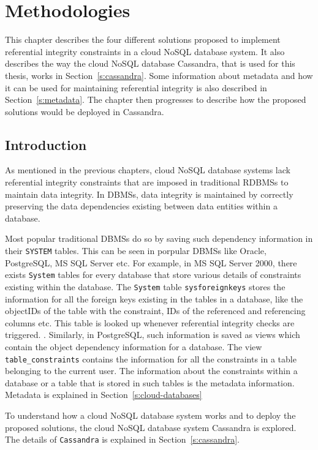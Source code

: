 \chapter{Methodologies}

This chapter describes the four different solutions proposed to implement
referential integrity constraints in a cloud \ac{NoSQL} database system. It also
describes the way the cloud \ac{NoSQL} database Cassandra, that is used
for this thesis, works in Section~\ref{s:cassandra}. Some information
about metadata and how it can be used for maintaining referential integrity is also described in
Section~\ref{s:metadata}. The chapter then progresses to describe how the
proposed solutions would be deployed in Cassandra.


\section{Introduction}

As mentioned in the previous chapters, cloud \ac{NoSQL} database systems lack
referential integrity constraints that are imposed in traditional \acp{RDBMS} to
maintain data integrity. In \acp{DBMS}, data integrity is maintained by
correctly preserving the data dependencies existing between data entities within
a database.

Most popular traditional \acp{DBMS} do so by saving such dependency information
in their \texttt{SYSTEM} tables. This can be seen in porpular \acp{DBMS} like
Oracle, PostgreSQL, MS SQL Server etc. For example, in MS SQL Server 2000, there
exists \texttt{System} tables for every database that store various details of
constraints existing within the database. The \texttt{System} table
\texttt{sysforeignkeys} stores the information for all the foreign keys existing
in the tables in a database, like the objectIDs of the table with the constraint,
IDs of the referenced and referencing columns etc. This table is looked up
whenever referential integrity checks are triggered. \citep{sys:msdn}.
Similarly, in PostgreSQL, such information is saved as views which contain the
object dependency information for a database. The view
\texttt{table\_constraints} contains the information for all the constraints in
a table belonging to the current user.%
The information about the constraints within a database or a table that is
stored in such tables is the metadata information. Metadata is explained in
 Section~\ref{s:cloud-databases}  

To understand how a cloud \ac{NoSQL} database system works and to deploy
the proposed solutions, the cloud \ac{NoSQL} database system Cassandra
is explored. The details of \texttt{Cassandra} is explained in
Section~\ref{s:cassandra}.


